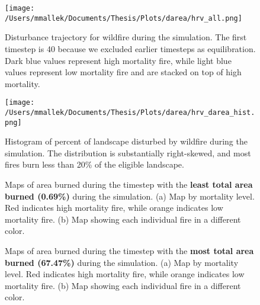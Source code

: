 \begin{figure}[!htbp]
\centering
\texttt{[image: /Users/mmallek/Documents/Thesis/Plots/darea/hrv\_all.png]}
\caption{Disturbance trajectory for wildfire during the simulation. The first timestep is 40 because we excluded earlier timesteps as equilibration. Dark blue values represent high mortality fire, while light blue values represent low mortality fire and are stacked on top of high mortality.}
\label{fig:darea}
\end{figure}

\begin{figure}[!htbp]
\centering
\texttt{[image: /Users/mmallek/Documents/Thesis/Plots/darea/hrv\_darea\_hist.png]}
\caption{Histogram of percent of landscape disturbed by wildfire during the simulation. The distribution is substantially right-skewed, and most fires burn less than 20\% of the eligible landscape.}
\label{fig:darea_hist}
\end{figure}

\clearpage

\begin{figure}[!htbp]
  \centering
  \caption{Maps of area burned during the timestep with the \textbf{least total area burned (0.69\%)} during the simulation. (a) Map by mortality level. Red indicates high mortality fire, while orange indicates low mortality fire. (b) Map showing each individual fire in a different color.}
  \label{fig:darea_min_map}
\end{figure}

\begin{figure}[!htbp]
  \centering
  \caption{Maps of area burned during the timestep with the \textbf{most total area burned (67.47\%)} during the simulation. (a) Map by mortality level. Red indicates high mortality fire, while orange indicates low mortality fire. (b) Map showing each individual fire in a different color.}
  \label{fig:darea_max_map}
\end{figure}

